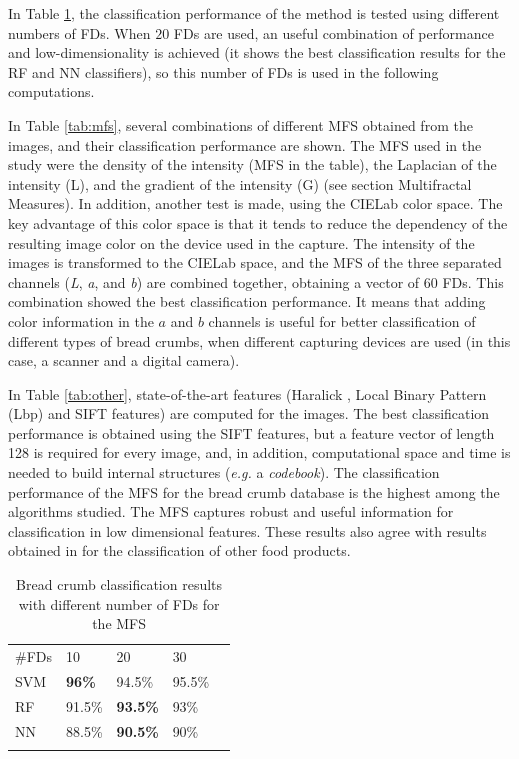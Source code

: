 In Table \ref{tab:number}, the classification performance of the method is tested using different numbers of FDs. When $20$ FDs are used, an useful combination of performance and low-di\-men\-sio\-na\-li\-ty is achieved (it shows the best classification results for the RF and NN classifiers), so this number of FDs is used in the following computations. 

In Table \ref{tab:mfs}, several combinations of different MFS obtained from the images, and their classification performance are shown. The MFS used in the study were the density of the intensity (MFS in the table), the Laplacian of the intensity (L), and the gradient of the intensity (G) (see section Multifractal Measures). In addition, another test is made, using the CIELab color space. The key advantage of this color space is that it tends to reduce the dependency of the resulting image color on the device used in the capture. The intensity of the images is transformed to the CIELab space, and the MFS of the three separated channels ({\em L}, {\em a}, and {\em b}) are combined together, obtaining a vector of $60$ FDs. This combination showed the best classification performance. It means that adding color information in the $a$ and $b$ channels is useful for better classification of different types of bread crumbs, when different capturing devices are used (in this case, a scanner and a digital camera).

In Table \ref{tab:other}, state-of-the-art features (Haralick \cite{Haralick73}, Local Binary Pattern (Lbp) \cite{Ojala96} and SIFT \cite{Lowe2004} features) are computed for the images. The best classification performance is obtained using the SIFT features, but a feature vector of length 128 is required for every image, and, in addition, computational space and time is needed to build internal structures ({\em e.g.} a {\em codebook}). The classification performance of the MFS for the bread crumb database is the highest among the algorithms studied. The MFS captures robust and useful information for classification in low dimensional features. These results also agree with results obtained in \cite{Bosch2011} for the classification of other food products.

\begin{table}
\caption{Bread crumb classification results with different number of FDs for the MFS}
\label{tab:number}       %
\begin{tabular}{lllll}
\hline\noalign{\smallskip}
\#FDs & 10  & 20 & 30 \\
\noalign{\smallskip}\hline\noalign{\smallskip}
SVM & \textbf{96\%} & 94.5\% & 95.5\% \\
RF  & 91.5\% & \textbf{93.5\%} & 93\% \\
NN & 88.5\% & \textbf{90.5\%} & 90\% \\
\noalign{\smallskip}\hline
\end{tabular}
\end{table}


